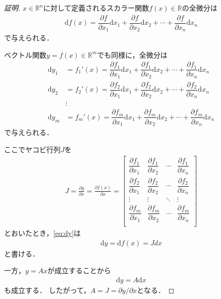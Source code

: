 \documentclass[a4j,10pt]{jsarticle}
\theoremstyle{plain}
\begin{document}
\begin{proof}[証明]
$x \in \mathbb{R}^n$に対して定義されるスカラー関数$f(x) \in \mathbb{R}$の全微分は
\begin{align}
    \mathrm{d}f(x) = \dfrac{\partial f}{\partial x_1} \mathrm{d}x_1+ \dfrac{\partial f}{\partial x_2} \mathrm{d}x_2 + \cdots +\dfrac{\partial f}{\partial x_n} \mathrm{d}x_n
\end{align}
で与えられる．

ベクトル関数$y=f(x)\in \mathbb{R}^m$でも同様に，全微分は
\begin{equation}
    \begin{aligned}
        \mathrm{d}y_1 &= f_1'(x) = \dfrac{\partial f_1}{\partial x_1} \mathrm{d}x_1+ \dfrac{\partial f_1}{\partial x_2} \mathrm{d}x_2 + \cdots +\dfrac{\partial f_1}{\partial x_n} \mathrm{d}x_n\\
    \mathrm{d}y_2 &= f_2'(x) = \dfrac{\partial f_2}{\partial x_1} \mathrm{d}x_1+ \dfrac{\partial f_2}{\partial x_2} \mathrm{d}x_2 + \cdots +\dfrac{\partial f_2}{\partial x_n} \mathrm{d}x_n\\
    &\vdots\\
    \mathrm{d}y_m &=f_m'(x) = \dfrac{\partial f_m}{\partial x_1} \mathrm{d}x_1+ \dfrac{\partial f_m}{\partial x_2} \mathrm{d}x_2 + \cdots +\dfrac{\partial f_m}{\partial x_n} \mathrm{d}x_n
    \end{aligned}
    \label{eq:dy}
\end{equation}
で与えられる．

ここでヤコビ行列$J$を
\begin{align}
    J = \frac{\partial y}{\partial x}= \frac{\partial f(x)}{\partial x}
    =\begin{bmatrix}
    \dfrac{\partial f_1}{\partial x_1} & \dfrac{\partial f_1}{\partial x_2} & \cdots & \dfrac{\partial f_1}{\partial x_n}\\
    \dfrac{\partial f_2}{\partial x_1} & \dfrac{\partial f_2}{\partial x_2} & \cdots & \dfrac{\partial f_2}{\partial x_n}\\
    \vdots & \vdots & \ddots & \vdots\\
    \dfrac{\partial f_m}{\partial x_1} & \dfrac{\partial f_m}{\partial x_2} & \cdots & \dfrac{\partial f_m}{\partial x_n}\\
\end{bmatrix}
\end{align}
とおいたとき，\eqref{eq:dy}は
\begin{align}
    \mathrm{d}y = \mathrm{d}f(x) = Jdx
\end{align}
と書ける．

一方，$y=Ax$が成立することから
\begin{align}
    \mathrm{d}y = A\mathrm{d}x
\end{align}
も成立する．
したがって，$A=J=\partial y/\partial x$となる．
\end{proof}
\end{document}
